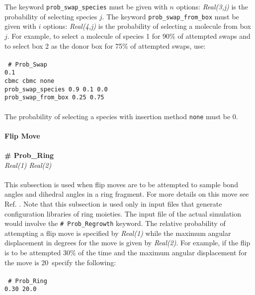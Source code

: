 %
The keyword \texttt{prob\_swap\_species} must be given with $n$ options: 
{\it Real(3,j)} is the probability of selecting species $j$.
The keyword {\tt prob\_swap\_from\_box} must be given with $i$ options:
{\it Real(4,j)} is the probability of selecting a molecule from box $j$.
For example, to select a molecule of species 1 for 90\% of attempted swaps and 
to select box 2 as the donor box for 75\% of attempted swaps, use: \\ \\
%
\texttt{ \# Prob\_Swap\\
0.1 \\ 
cbmc cbmc none \\
prob\_swap\_species 0.9 0.1 0.0 \\
prob\_swap\_from\_box 0.25 0.75 \\ \\ }
%
The probability of selecting a species with insertion method \texttt{none} must be 0. \\ \\
%
%
%
%
{\bf Flip Move}\\ \\
{\bf \# Prob\_Ring} \\
{\it Real(1) Real(2)} \\ \\
%
This subsection is used when flip moves are to be attempted to sample bond angles and 
dihedral angles in a ring fragment. 
For more details on this move see Ref. \cite{Shah:2011}. 
Note that this subsection is used only in input files
that generate configuration libraries of ring moieties. The input file of the 
actual simulation would involve the \texttt{\# Prob\_Regrowth} keyword.
The relative probability of attempting a flip move is 
specified by {\it Real(1)} while the maximum angular displacement 
in degrees for the move is given by {\it Real(2)}. 
For example, if the flip is to be attempted 30\% of the 
time and the maximum angular displacement for the 
move is 20\degree~specify the following: \\ \\
%
\texttt{
\# Prob\_Ring \\
0.30 20.0 \\ \\}
%
%
